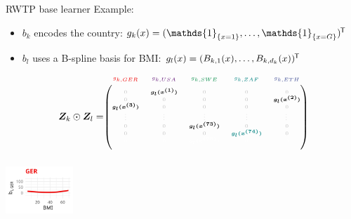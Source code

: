 \documentclass[t,10pt]{beamer}
\begin{document}
\begin{frame}{RWTP base learner}
  Example:
  \begin{itemize}
    \item $b_k$ encodes the country: $g_k(x) = (\mathds{1}_{\{x = 1\}}, \dots, \mathds{1}_{\{x = G\}})^\tran$
    \item $b_l$ uses a B-spline basis for BMI: $g_l(x) = (B_{k,1}(x), \dots, B_{k,d_k}(x))^{\mkern-1.5mu\mathsf{T}}$
  \end{itemize}
  $$
    \design_k \odot \design_l = \tiny\begin{blockarray}{ccccc}
      \color[HTML]{EE0000}g_{k,GER} & \color[HTML]{631879}g_{k,USA} & \color[HTML]{008B45}g_{k,SWE} & \color[HTML]{008280}g_{k,ZAF} & \color[HTML]{3B4992}g_{k,ETH}\\
    \begin{block}{(ccccc)}
      \phantom{x}\\
      \color{lightgray}0 & \color{black}\bm{g_l(x^{(1)})} & \color{lightgray}0 & \color{lightgray}0 & \color{lightgray}0 \\
      \color{lightgray}0 & \color{lightgray}0 & \color{lightgray}0 & \color{lightgray}0 & \color{black}\bm{g_l(x^{(2)})} \\
      \color{black}\bm{g_l(x^{(3)})} & \color{lightgray}0 & \color{lightgray}0 & \color{lightgray}0 & \color{lightgray}0 \\
      \color{lightgray}\vdots & \color{lightgray}\vdots & \color{lightgray}\vdots & \color{lightgray}\vdots & \color{lightgray}\vdots \\
      \color{lightgray}0 & \color{lightgray}0 & \color{black}\bm{g_l(x^{(73)})} & \color{lightgray}0 & \color{lightgray}0 \\
      \color{lightgray}0 & \color{lightgray}0 & \color{lightgray}0 & \color[HTML]{008280}\bm{g_l(x^{(74)})} & \color{lightgray}0 \\
      \color{white}0 & \color{white}0 & \color{white}\bm{g_l(x^{(75)})} & \color{white}0 & \color{white}0 \\
      \phantom{x}\\
    \end{block}
  \end{blockarray}
  $$
  \normalsize
  {\includegraphics[width=0.19\textwidth]{figures/bs-tensor/fig-tensor-GER.png}}

\end{frame}
\end{document}
